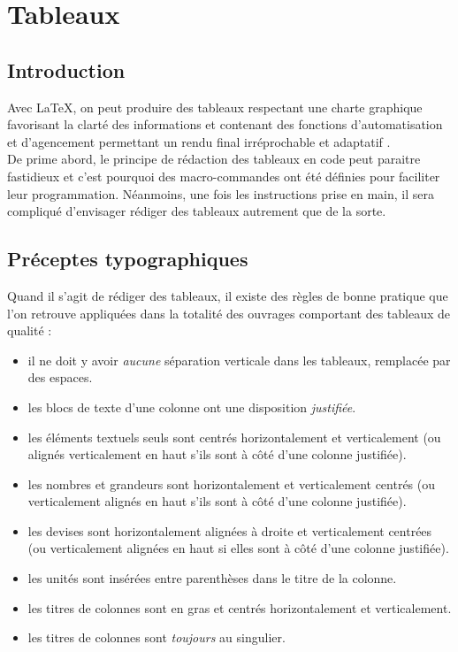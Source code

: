 \documentclass[a4paper, 11pt, twoside, fleqn]{memoir}
\begin{document}

\chapter{Tableaux\label{chap:tableaux}}
	\ChapFrame %
	
	\section{Introduction}

Avec \LaTeX{}, on peut produire des tableaux respectant une charte graphique favorisant la clarté des informations et contenant des fonctions d'automatisation et d'agencement permettant un rendu final irréprochable et \og adaptatif \fg{}.\\
De prime abord, le principe de rédaction des tableaux en code peut paraitre fastidieux et c'est pourquoi des macro-commandes ont été définies pour faciliter leur programmation. Néanmoins, une fois les instructions prise en main, il sera compliqué d'envisager rédiger des tableaux autrement que de la sorte.

	\section{Préceptes typographiques}

Quand il s'agit de rédiger des tableaux, il existe des règles de \og bonne pratique \fg{} que l'on retrouve appliquées dans la totalité des ouvrages comportant des tableaux de qualité :
\begin{itemize}
\item il ne doit y avoir \emph{aucune} séparation verticale dans les tableaux, remplacée par des espaces.
\item les blocs de texte d'une colonne ont une disposition \emph{justifiée}.
\item les éléments textuels seuls sont centrés horizontalement et verticalement (ou alignés verticalement en haut s'ils sont à côté d'une colonne justifiée).
\item les nombres et grandeurs sont horizontalement et verticalement centrés (ou verticalement alignés en haut s'ils sont à côté d'une colonne justifiée).
\item les devises sont horizontalement alignées à droite et verticalement centrées (ou verticalement alignées en haut si elles sont à côté d'une colonne justifiée).
\item les unités sont insérées entre parenthèses dans le titre de la colonne.
\item les titres de colonnes sont en gras et centrés horizontalement et verticalement.
\item les titres de colonnes sont \emph{toujours} au singulier.
\end{itemize}
\end{document}
